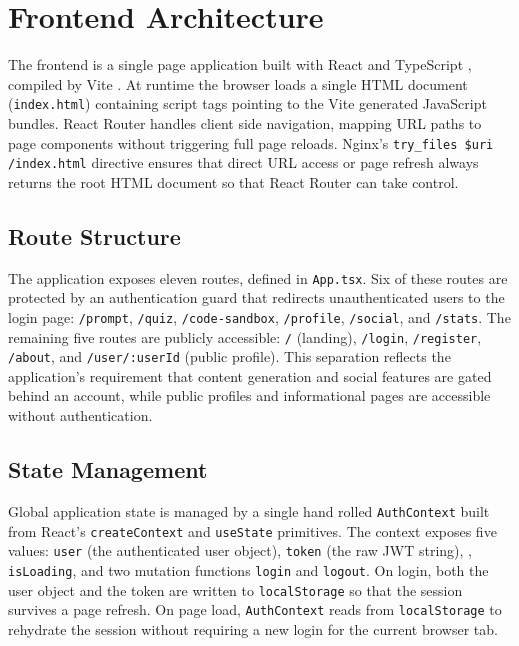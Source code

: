 \section{Frontend Architecture}

The frontend is a single page application built with React
\cite{react2013} and TypeScript \cite{typescript2025}, compiled by Vite
\cite{vite2025}. At runtime the browser loads a single HTML document
(\texttt{index.html}) containing script tags pointing to the Vite
generated JavaScript bundles. React Router handles client side
navigation, mapping URL paths to page components without triggering
full page reloads. Nginx's \texttt{try\_files \$uri /index.html}
directive ensures that direct URL access or page refresh always returns
the root HTML document so that React Router can take control.

\subsection{Route Structure}

The application exposes eleven routes, defined in \texttt{App.tsx}. Six
of these routes are protected by an authentication guard that redirects
unauthenticated users to the login page: \texttt{/prompt},
\texttt{/quiz}, \texttt{/code-sandbox}, \texttt{/profile},
\texttt{/social}, and \texttt{/stats}. The remaining five routes are
publicly accessible: \texttt{/} (landing), \texttt{/login},
\texttt{/register}, \texttt{/about}, and \texttt{/user/:userId} (public
profile). This separation reflects the application's requirement that
content generation and social features are gated behind an account,
while public profiles and informational pages are accessible without
authentication.

\subsection{State Management}

Global application state is managed by a single hand rolled
\texttt{AuthContext} built from React's \texttt{createContext} and
\texttt{useState} primitives. The context exposes five values:
\texttt{user} (the authenticated user object), \texttt{token} (the raw
JWT string), , \texttt{isLoading}, and two
mutation functions \texttt{login} and \texttt{logout}. On login, both
the user object and the token are written to \texttt{localStorage} so
that the session survives a page refresh. On page load,
\texttt{AuthContext} reads from \texttt{localStorage} to rehydrate the
session without requiring a new login for the current browser tab.

